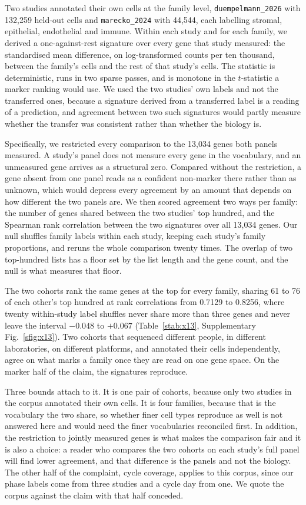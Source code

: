 Two studies annotated their own cells at the family level,
\texttt{duempelmann\_2026} with 132{,}259 held-out cells and
\texttt{marecko\_2024} with 44{,}544, each labelling stromal, epithelial,
endothelial and immune. Within each study and for each family, we derived a
one-against-rest signature over every gene that study measured: the
standardised mean difference, on log-transformed counts per ten thousand,
between the family's cells and the rest of that study's cells. The
statistic is deterministic, runs in two sparse passes, and is monotone in
the $t$-statistic a marker ranking would use. We used the two studies' own
labels and not the transferred ones, because a signature derived from a
transferred label is a reading of a prediction, and agreement between two
such signatures would partly measure whether the transfer was consistent
rather than whether the biology is.

Specifically, we restricted every comparison to the 13{,}034 genes both
panels measured. A study's panel does not measure every gene in the
vocabulary, and an unmeasured gene arrives as a structural zero. Compared
without the restriction, a gene absent from one panel reads as a confident
non-marker there rather than as unknown, which would depress every
agreement by an amount that depends on how different the two panels are. We
then scored agreement two ways per family: the number of genes shared
between the two studies' top hundred, and the Spearman rank correlation
between the two signatures over all 13{,}034 genes. Our null shuffles
family labels within each study, keeping each study's family proportions,
and reruns the whole comparison twenty times. The overlap of two
top-hundred lists has a floor set by the list length and the gene count,
and the null is what measures that floor.

The two cohorts rank the same genes at the top for every family, sharing 61
to 76 of each other's top hundred at rank correlations from 0.7129 to
0.8256, where twenty within-study label shuffles never share more than
three genes and never leave the interval $-0.048$ to $+0.067$
(Table~\ref{stab:x13}, Supplementary Fig.~\ref{sfig:x13}). Two cohorts that sequenced different people, in
different laboratories, on different platforms, and annotated their cells
independently, agree on what marks a family once they are read on one gene
space. On the marker half of the claim, the signatures reproduce.

Three bounds attach to it. It is one pair of cohorts, because only two
studies in the corpus annotated their own cells. It is four families,
because that is the vocabulary the two share, so whether finer cell types
reproduce as well is not answered here and would need the finer
vocabularies reconciled first. In addition, the restriction to jointly
measured genes is what makes the comparison fair and it is also a choice: a
reader who compares the two cohorts on each study's full panel will find
lower agreement, and that difference is the panels and not the biology. The
other half of the complaint, cycle coverage, applies to this corpus, since
our phase labels come from three studies and a cycle day from one. We quote
the corpus against the claim with that half conceded.

